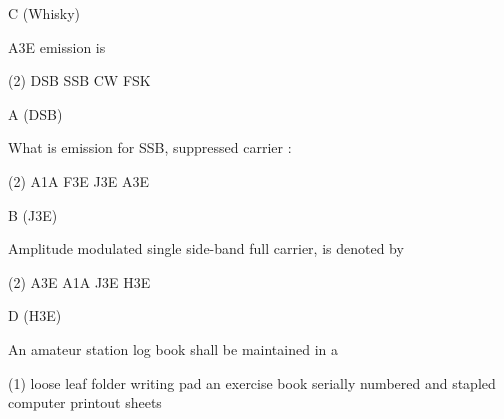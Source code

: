 \documentclass[a4paper]{article}
\begin{document}
\begin{solution}
	C (Whisky)
\end{solution}

\vspace{5mm}



\begin{question}A3E emission is
	\begin{tasks}(2)
		\task DSB
		\task SSB
		\task CW
		\task FSK
	\end{tasks}
\end{question}

\begin{solution}
	A (DSB)
\end{solution}

\vspace{5mm}



\begin{question}What is emission for SSB, suppressed carrier :
	\begin{tasks}(2)
		\task A1A
		\task F3E
		\task J3E
		\task A3E
	\end{tasks}
\end{question}

\begin{solution}
	B (J3E)
\end{solution}

\vspace{5mm}



\begin{question}Amplitude modulated single side-band full carrier, is denoted by
	\begin{tasks}(2)
		\task A3E
		\task A1A
		\task J3E
		\task H3E
	\end{tasks}
\end{question}

\begin{solution}
	D (H3E)
\end{solution}

\vspace{5mm}



\begin{question}An amateur station log book shall be maintained in a
	\begin{tasks}(1)
		\task loose leaf folder
		\task writing pad
		\task an exercise book serially numbered and stapled
		\task computer printout sheets
	\end{tasks}
\end{question}
\end{document}
